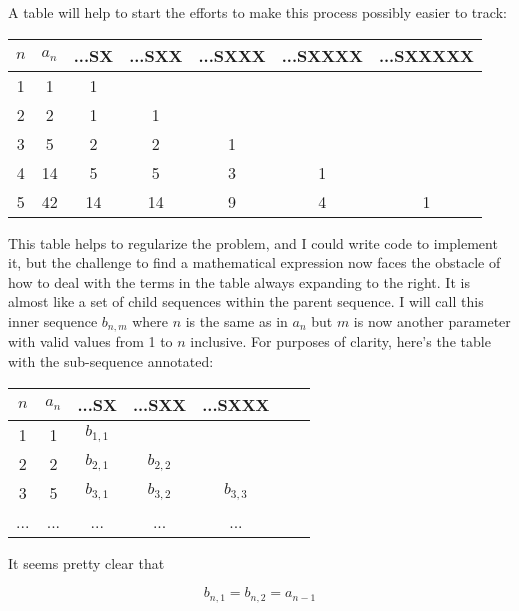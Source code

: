 \documentclass{article}
\begin{document}
\par

A table will help to start the efforts to make this process possibly easier to track:

\begin{table}[h!]
\centering
 \begin{tabular}{|c | c | c | c | c | c | c|} 
 \hline
 $n$ & $a_n$ & ...SX & ...SXX & ...SXXX & ...SXXXX & ...SXXXXX \\ [0.5ex] 
 \hline
 1 & 1 & 1 &  &  &  & \\ 
 2 & 2 & 1 & 1 &  &  & \\
 3 & 5 & 2 & 2 & 1 &  & \\
 4 & 14 & 5 & 5 & 3 & 1 & \\
 5 & 42 & 14 & 14 & 9 & 4 & 1 \\
 \hline
 \end{tabular}
\end{table}

This table helps to regularize the problem, and I could write code to implement it, but the challenge to find a mathematical expression now faces the obstacle of how to deal with the terms in the table always expanding to the right.  It is almost like a set of child sequences within the parent sequence.  I will call this inner sequence $b_{n,m}$ where $n$ is the same as in $a_n$ but $m$ is now another parameter with valid values from 1 to $n$ inclusive.  For purposes of clarity, here's the table with the sub-sequence annotated:

\begin{table}[h!]
  \centering
   \begin{tabular}{|c | c | c | c | c | c | c|} 
   \hline
   $n$ & $a_n$ & ...SX & ...SXX & ...SXXX \\ [0.5ex] 
   \hline
   1 & 1 & $b_{1,1}$ &  & \\ 
   2 & 2 & $b_{2,1}$ & $b_{2,2}$ & \\
   3 & 5 & $b_{3,1}$ & $b_{3,2}$ & $b_{3,3}$ \\
   ... & ... & ... & ... & ... \\
   \hline
   \end{tabular}
\end{table}

\par

It seems pretty clear that

\begin{equation*}
  b_{n,1} = b_{n,2} = a_{n-1}
\end{equation*}
\end{document}
